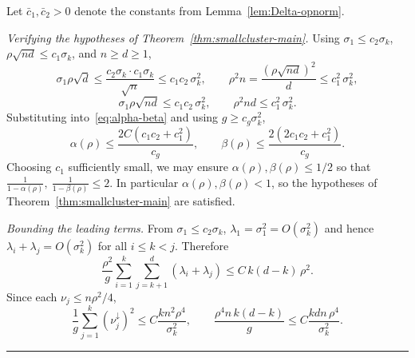 \documentclass{article}
\newcommand{\BlackBox}{\rule{1.5ex}{1.5ex}}  %
\newenvironment{proof}{\par\noindent{\bf Proof\ }}{\hfill\BlackBox\par\medskip}
\begin{document}
\begin{proof}
Let $\bar c_1, \bar c_2 > 0$ denote the constants from Lemma~\ref{lem:Delta-opnorm}.

\emph{Verifying the hypotheses of Theorem~\ref{thm:smallcluster-main}.} Using $\sigma_1 \le c_2\sigma_k$, $\rho\sqrt{nd}\le c_1\sigma_k$, and $n \ge d \ge 1$,
\begin{equation*}
    \sigma_1\rho\sqrt d \le \frac{c_2\sigma_k\cdot c_1\sigma_k}{\sqrt n} \le c_1 c_2\,\sigma_k^2,\qquad
    \rho^2 n = \frac{(\rho\sqrt{nd})^2}{d} \le c_1^2\,\sigma_k^2,
\end{equation*}
\begin{equation*}
    \sigma_1\rho\sqrt{nd} \le c_1 c_2\,\sigma_k^2,\qquad
    \rho^2 nd \le c_1^2\,\sigma_k^2.
\end{equation*}
Substituting into~\eqref{eq:alpha-beta} and using $g \ge c_g\sigma_k^2$,
\begin{equation*}
    \alpha(\rho) \le \frac{2C(c_1 c_2 + c_1^2)}{c_g},\qquad
    \beta(\rho) \le \frac{2(2 c_1 c_2 + c_1^2)}{c_g}.
\end{equation*}
Choosing $c_1$ sufficiently small, we may ensure $\alpha(\rho), \beta(\rho) \le 1/2$ so that $\tfrac{1}{1-\alpha(\rho)},\ \tfrac{1}{1-\beta(\rho)} \le 2$. In particular $\alpha(\rho), \beta(\rho) < 1$, so the hypotheses of Theorem~\ref{thm:smallcluster-main} are satisfied.

\emph{Bounding the leading terms.} From $\sigma_1 \le c_2\sigma_k$, $\lambda_1 = \sigma_1^2 = O(\sigma_k^2)$ and hence $\lambda_i+\lambda_j = O(\sigma_k^2)$ for all $i\le k<j$. Therefore
\begin{equation*}
    \frac{\rho^2}{g}\sum_{i=1}^{k}\sum_{j=k+1}^{d}(\lambda_i+\lambda_j) \le C\,k(d-k)\,\rho^2.
\end{equation*}
Since each $\nu_j \le n\rho^2/4$,
\begin{equation*}
    \frac{1}{g}\sum_{j=1}^{k}(\nu_j^\downarrow)^2 \le C\frac{kn^2\rho^4}{\sigma_k^2}, \qquad \frac{\rho^4 n\,k(d-k)}{g} \le C\frac{kdn\,\rho^4}{\sigma_k^2}.
\end{equation*}


\end{proof}
\end{document}
